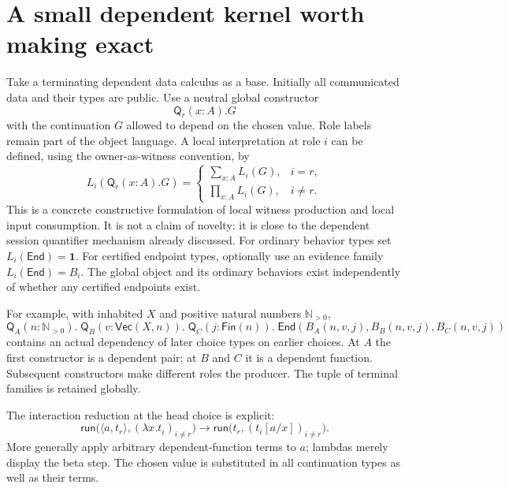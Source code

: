 \documentclass[11pt]{article}
\newcommand{\End}{\mathsf{End}}
\newcommand{\Q}{\mathsf{Q}}
\begin{document}
\section{A small dependent kernel worth making exact}

Take a terminating dependent data calculus as a base. Initially all communicated
data and their types are public. Use a neutral global constructor
\[
  \Q_r(x:A).G
\]
with the continuation $G$ allowed to depend on the chosen value. Role labels
remain part of the object language. A local interpretation at role $i$ can be
defined, using the owner-as-witness convention, by
\[
 L_i(\Q_r(x:A).G)=
 \begin{cases}
   \displaystyle\sum_{x:A} L_i(G),&i=r,\\[3pt]
   \displaystyle\prod_{x:A} L_i(G),&i\ne r.
 \end{cases}
 \tag{6}
\]
This is a concrete constructive formulation of local witness production and
local input consumption. It is not a claim of novelty: it is close to the
dependent session quantifier mechanism already discussed. For ordinary behavior
types set $L_i(\End)=\mathbf1$. For certified endpoint types, optionally use an
evidence family $L_i(\End)=B_i$. The global object and its ordinary behaviors
exist independently of whether any certified endpoints exist.

For example, with inhabited $X$ and positive natural numbers $\mathbb N_{>0}$,
\[
 \Q_A(n:\mathbb N_{>0}).\;
 \Q_B(v:\mathsf{Vec}(X,n)).\;
 \Q_C(j:\mathsf{Fin}(n)).\;
 \End(B_A(n,v,j),B_B(n,v,j),B_C(n,v,j))
 \tag{7}
\]
contains an actual dependency of later choice types on earlier choices. At $A$
the first constructor is a dependent pair; at $B$ and $C$ it is a dependent
function. Subsequent constructors make different roles the producer. The tuple
of terminal families is retained globally.

The interaction reduction at the head choice is explicit:
\[
 \mathsf{run}\bigl(\langle a,t_r\rangle,
                     (\lambda x.t_i)_{i\ne r}\bigr)
 \longrightarrow
 \mathsf{run}\bigl(t_r,(t_i[a/x])_{i\ne r}\bigr).
 \tag{8}
\]
More generally apply arbitrary dependent-function terms to $a$; lambdas merely
display the beta step. The chosen value is substituted in all continuation
types as well as their terms.
\end{document}
